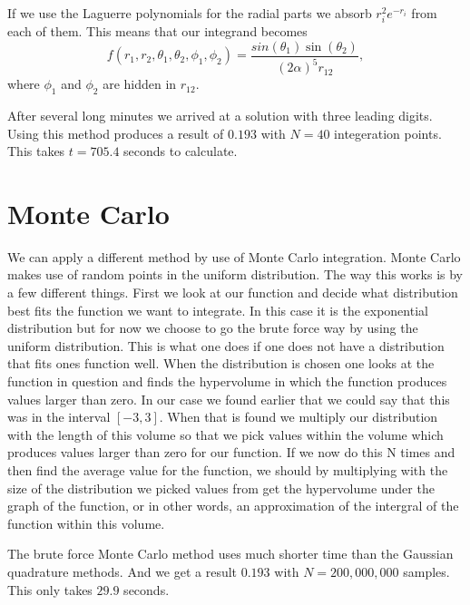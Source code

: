 \documentclass{aa}   %
\begin{document}
If we use the Laguerre polynomials for the radial parts we absorb $r_i^2 e^{-r_i}$ from each of them.
This means that our integrand becomes 
\begin{equation}
 f(r_1,r_2,\theta_1,\theta_2,\phi_1,\phi_2) =  \frac{sin(\theta_1)\sin(\theta_2)}{(2\alpha)^5 r_{12}},
\end{equation}
where $\phi_1$ and $\phi_2$ are hidden in $r_{12}$.

After several long minutes we arrived at a solution with three leading digits. Using this method produces a result of $0.193$ with $N = 40$ integeration points. This takes $t = 705.4$ seconds to calculate.

\section{Monte Carlo}\label{sec:Monte Carlo}
We can apply a different method by use of Monte Carlo integration. Monte Carlo makes use of random points in the uniform distribution. The way this works is by a few different things. First we look at our function and decide what distribution best fits the function we want to integrate. In this case it is the exponential distribution but for now we choose to go the brute force way by using the uniform distribution. This is what one does if one does not have a distribution that fits ones function well. When the distribution is chosen one looks at the function in question and finds the hypervolume in which the function produces values larger than zero. In our case we found earlier that we could say that this was in the interval $[-3,3]$. When that is found we multiply our distribution with the length of this volume so that we pick values within the volume which produces values larger than zero for our function. If we now do this N times and then find the average value for the function, we should by multiplying with the size of the distribution we picked values from get the hypervolume under the graph of the function, or in other words, an approximation of the intergral of the function within this volume.

The brute force Monte Carlo method uses much shorter time than the Gaussian quadrature methods.
And we get a result $0.193$ with $N = 200,000,000$ samples. This only takes $29.9$ seconds.
\end{document}

